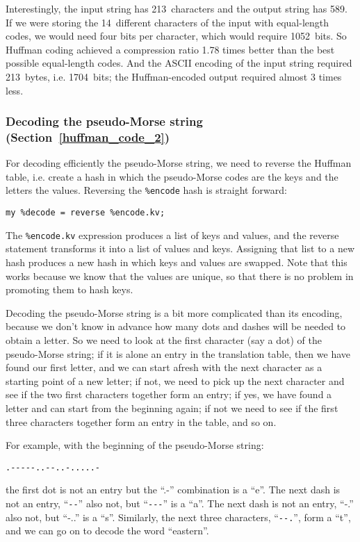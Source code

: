 {Interestingly, the input string has 213~characters and the output 
string has 589. If we were storing the 14~different characters of 
the input with equal-length codes, we would need four bits per 
character, which would require 1052~bits. So Huffman coding 
achieved a compression ratio 1.78 times better than the best possible 
equal-length codes. And the ASCII encoding of the input string 
required 213~bytes, i.e. 1704~bits; the Huffman-encoded output 
required almost 3 times less. 

\subsubsection{Decoding the pseudo-Morse string (Section~\ref{huffman_code_2})}

For decoding efficiently the pseudo-Morse string, we need to reverse 
the Huffman table, i.e. create a hash in which the pseudo-Morse codes 
are the keys and the letters the values. Reversing the \verb'%encode' 
hash is straight forward:

\begin{verbatim}
my %decode = reverse %encode.kv;
\end{verbatim}

The \verb'%encode.kv' expression produces a list of keys and values, 
and the reverse statement transforms it into a list of values and 
keys. Assigning that list to a new hash produces a new hash in 
which keys and values are swapped. Note that this works because 
we know that the values are unique, so that there is no problem 
in promoting them to hash keys.

Decoding the pseudo-Morse string is a bit more complicated than 
its encoding, because we don't know in advance how many dots and 
dashes will be needed to obtain a letter. So we need to look at the 
first character (say a dot) of the pseudo-Morse string; if it is alone an 
entry in the translation table, then we have found our first 
letter, and we can start afresh with the next character as a starting 
point of a new letter; if not, we need to pick up the next character 
and see if the two first characters together form an entry; if yes, 
we have found a letter and can start from the beginning again; if 
not we need to see if the first three characters together form an 
entry in the table, and so on.

For example, with the beginning of the pseudo-Morse string:
\begin{verbatim}
.-----..--..-.....-
\end{verbatim}
the first dot is not an entry but the ``.-'' combination is a ``e''.
The next dash is not an entry, ``\verb"--"'' also not, but 
``\verb"---"'' is a ``a''.
The next dash is not an entry, ``-.'' also not, but ``-..'' is a ``s''. 
Similarly, the next three characters, ``\verb"--."'', form a ``t'', and we 
can go on to decode the word ``eastern''.

}
